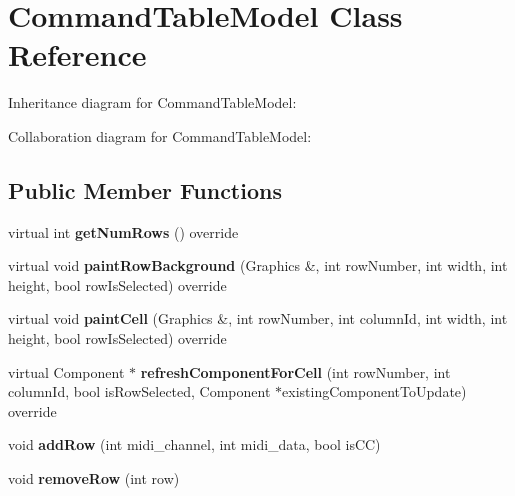 \hypertarget{class_command_table_model}{}\section{Command\+Table\+Model Class Reference}
\label{class_command_table_model}


Inheritance diagram for Command\+Table\+Model\+:


Collaboration diagram for Command\+Table\+Model\+:
\subsection*{Public Member Functions}
\begin{DoxyCompactItemize}
\item 
virtual int {\bfseries get\+Num\+Rows} () override\hypertarget{class_command_table_model_ae89ca7ee2106ffe3a8d326da313e3bf2}{}\label{class_command_table_model_ae89ca7ee2106ffe3a8d326da313e3bf2}

\item 
virtual void {\bfseries paint\+Row\+Background} (Graphics \&, int row\+Number, int width, int height, bool row\+Is\+Selected) override\hypertarget{class_command_table_model_a288a0dec11b5bbfb6fdb5bcd9c4a81ec}{}\label{class_command_table_model_a288a0dec11b5bbfb6fdb5bcd9c4a81ec}

\item 
virtual void {\bfseries paint\+Cell} (Graphics \&, int row\+Number, int column\+Id, int width, int height, bool row\+Is\+Selected) override\hypertarget{class_command_table_model_a291f0a2ace126893e8639efaa1d817a3}{}\label{class_command_table_model_a291f0a2ace126893e8639efaa1d817a3}

\item 
virtual Component $\ast$ {\bfseries refresh\+Component\+For\+Cell} (int row\+Number, int column\+Id, bool is\+Row\+Selected, Component $\ast$existing\+Component\+To\+Update) override\hypertarget{class_command_table_model_a46ef1923c37173d28bf25c840403af69}{}\label{class_command_table_model_a46ef1923c37173d28bf25c840403af69}

\item 
void {\bfseries add\+Row} (int midi\+\_\+channel, int midi\+\_\+data, bool is\+CC)\hypertarget{class_command_table_model_a34e3b342c1741fe6363e2873b68171b1}{}\label{class_command_table_model_a34e3b342c1741fe6363e2873b68171b1}

\item 
void {\bfseries remove\+Row} (int row)\hypertarget{class_command_table_model_aedd06c409a9326aa50077244c10f5dbd}{}\label{class_command_table_model_aedd06c409a9326aa50077244c10f5dbd}


\end{DoxyCompactItemize}

